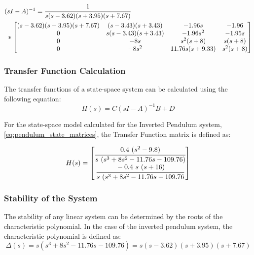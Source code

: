 \documentclass[]{article}
\begin{document}
			\begin{equation}
				\begin{aligned}
					&(sI - A)^{-1} = \cfrac{1}{s (s-3.62) (s + 3.95) (s + 7.67)} \\
					&\ *\mqty[	(s - 3.62) (s + 3.95) (s + 7.67)	&(s - 3.43) (s + 3.43)		&-1.96 s			&-1.96\\
								0									&s (s - 3.43) (s + 3.43)	&-1.96 s^2			&-1.95 s\\
								0									&-8 s						&s^2 (s+8)			&s (s+8)\\
								0									&-8 s^2						&11.76 s (s+9.33)	&s^2 (s+8)
					]
				\end{aligned}
				\label{eq:pendulum_(sI-A)-1}
			\end{equation}
		
		\subsubsection{Transfer Function Calculation}
			The transfer functions of a state-space system can be calculated using the following equation:
			\begin{equation}
				H(s) = C (sI-A)^{-1} B + D
				\label{eq:tf_def}
			\end{equation}
			
			For the state-space model calculated for the Inverted Pendulum system, \eqref{eq:pendulum_state_matrices}, the Transfer Function matrix is defined as:
			
			\begin{equation}
				H(s) = \mqty[	\cfrac{0.4 \ (s^2 - 9.8)}{s \ (s^3 + 8s^2 - 11.76s - 109.76)}\\
								\cfrac{-0.4 \ s \ (s+16)}{s \ (s^3 + 8s^2 - 11.76s - 109.76}
								]
				\label{eq:pendulum_H(s)}
			\end{equation}
			
		\subsubsection{Stability of the System}
			The stability of any linear system can be determined by the roots of the characteristic polynomial. In the case of the inverted pendulum system, the characteristic polynomial is defined as:
			\begin{equation}
				\Delta (s) = s (s^3 + 8s^2 - 11.76s - 109.76) = s (s-3.62) (s + 3.95) (s + 7.67)
				\label{eq:pendulum_Delta(s)}
			\end{equation}
			
\end{document}
